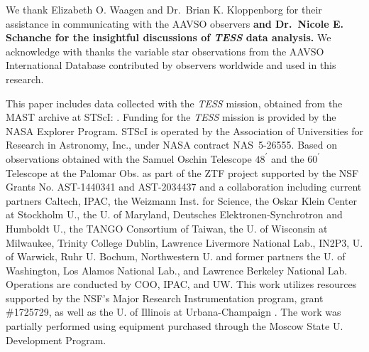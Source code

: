 \documentclass[twocolumn]{aastex631}
\begin{document}
\begin{acknowledgments}
\begin{small}
We thank Elizabeth O. Waagen and Dr.~Brian K. Kloppenborg for their assistance in communicating with the AAVSO observers 
{\bf and Dr.~Nicole E. Schanche for the insightful discussions of {\em TESS} data analysis.}
We acknowledge with thanks the variable star observations from the AAVSO International Database contributed by observers worldwide and used in this research.

This paper includes data collected with the {\em TESS} mission, obtained from the MAST
archive at 
STScI: .
Funding for the {\em TESS} mission is provided by the NASA Explorer Program. 
STScI is operated by the Association of Universities for Research in Astronomy, Inc., under NASA contract NAS~5-26555.
Based on observations 
obtained with the Samuel Oschin Telescope $48^{\prime}$ and the $60^{\prime}$ Telescope at the Palomar
Obs. as part of the ZTF project %
supported by the 
NSF Grants No. AST-1440341 and AST-2034437 and a collaboration including current partners Caltech, IPAC, 
the Weizmann Inst. for Science, the Oskar Klein Center at Stockholm U., the U. of Maryland, 
Deutsches Elektronen-Synchrotron and Humboldt U., the TANGO Consortium of Taiwan, 
the U. of Wisconsin at Milwaukee, Trinity College Dublin,
Lawrence Livermore National Lab., IN2P3, U. of Warwick, Ruhr U. Bochum, Northwestern U. and
former partners the U. of Washington, Los Alamos National Lab., and Lawrence Berkeley National Lab.
Operations are conducted by COO, IPAC, and UW.
This work utilizes resources supported by the NSF's Major Research Instrumentation program, grant \#1725729, as well as the U. of Illinois at Urbana-Champaign \citep{kindratenko2020hal}.
The work was partially performed using equipment purchased through the Moscow State U. Development Program.


\end{small}
\end{acknowledgments}
\end{document}
